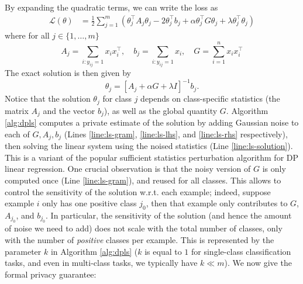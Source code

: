 \documentclass[letterpaper]{article} \usepackage{fullpage}
\def\calL{\mathcal{L}}
\begin{document}
By expanding the quadratic terms, we can write the loss as
\begin{align*}
\calL(\theta) &= \frac{1}{2}\sum_{j = 1}^m \left(\theta_j^\top A_j \theta_j - 2\theta_j^\top b_j + \alpha \theta_j^\top G \theta_j + \lambda \theta_j^\top \theta_j\right)
\end{align*}
where for all $j \in \{1, \dots, m\}$
\begin{equation}
A_j = \sum_{i : y_{ij} = 1} x_i x_i^\top, \quad b_j = \sum_{i : y_{ij} = 1}x_i, \quad G = \sum_{i = 1}^n x_i x_i^\top
\label{eq:dpls_stats}
\end{equation}
The exact solution is then given by
\[
\theta_j = \left[A_j + \alpha G + \lambda I \right]^{-1} b_j.
\]
Notice that the solution $\theta_j$ for class $j$ depends on class-specific statistics (the matrix $A_j$ and the vector $b_j$), as well as the global quantity $G$. Algorithm \ref{alg:dpls} computes a private estimate of the solution by adding Gaussian noise to each of $G, A_j, b_j$ (Lines \ref{line:ls-gram}, \ref{line:ls-lhs}, and \ref{line:ls-rhs} respectively), then solving the linear system using the noised statistics (Line \ref{line:ls-solution}). This is a variant of the popular sufficient statistics perturbation algorithm for DP linear regression. One crucial observation is that the noisy version of $G$ is only computed once (Line \ref{line:ls-gram}), and reused for all classes. This allows to control the sensitivity of the solution w.r.t. each example; indeed, suppose example $i$ only has one positive class $j_0$, then that example only contributes to $G$, $A_{j_0}$, and $b_{j_0}$. In particular, the sensitivity of the solution (and hence the amount of noise we need to add) does not scale with the total number of classes, only with the number of \emph{positive} classes per example. This is represented by the parameter $k$ in Algorithm \ref{alg:dpls} ($k$ is equal to $1$ for single-class classification tasks, and even in multi-class tasks, we typically have $k \ll m$). We now give the formal privacy guarantee:
\end{document}
